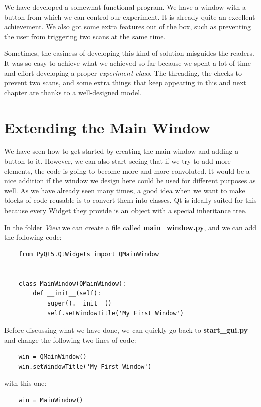 We have developed a somewhat functional program. We have a window with a button from which we can control our experiment. It is already quite an excellent achievement. We also got some extra features out of the box, such as preventing the user from triggering two scans at the same time.

Sometimes, the easiness of developing this kind of solution misguides the readers. It was so easy to achieve what we achieved so far because we spent a lot of time and effort developing a proper \emph{experiment class}. The threading, the checks to prevent two scans, and some extra things that keep appearing in this and next chapter are thanks to a well-designed model.


\section{Extending the Main Window}\label{sec:extending-main-window}
We have seen how to get started by creating the main window and adding a button to it. However, we can also start seeing that if we try to add more elements, the code is going to become more and more convoluted. It would be a nice addition if the window we design here could be used for different purposes as well. As we have already seen many times, a good idea when we want to make blocks of code reusable is to convert them into classes. Qt is ideally suited for this because every Widget they provide is an object with a special inheritance tree.

In the folder \emph{View} we can create a file called \textbf{main\_window.py}, and we can add the following code:

\begin{verbatim}
    from PyQt5.QtWidgets import QMainWindow


    class MainWindow(QMainWindow):
        def __init__(self):
            super().__init__()
            self.setWindowTitle('My First Window')
\end{verbatim}

Before discussing what we have done, we can quickly go back to \textbf{start\_gui.py} and change the following two lines of code:

\begin{verbatim}
    win = QMainWindow()
    win.setWindowTitle('My First Window')
\end{verbatim}

with this one:

\begin{verbatim}
    win = MainWindow()
\end{verbatim}

